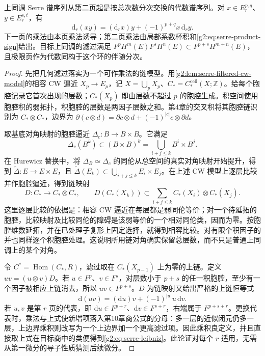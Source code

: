 \begin{theorem}\label{g2:thm:serre-multiplicative}
	上同调 Serre 谱序列从第二页起是按总次数分次交换的代数谱序列。对 \(x\in E_r^{p,q}\)、\(y\in E_r^{s,t}\)，有
	\begin{equation}\label{g2:eq:serre-leibniz}
		\mathrm d_r(xy)=(\mathrm d_rx)y+(-1)^{p+q}x\,\mathrm d_ry.
	\end{equation}
	下一页的乘法由本页乘法诱导；第二页乘法由局部系数杯积和\cref{g2:eq:serre-product-sign}给出。目标上同调的滤过满足 \(F^pH^m(E)F^sH^n(E)\subset F^{p+s}H^{m+n}(E)\)，且极限页作为代数同构于这个环的伴随分次。
\end{theorem}
\begin{proof}
	先把几何滤过落实为一个可作乘法的链模型。用\cref{g2:lem:serre-filtered-cw-model}的相容 CW 逼近 \(X_p\to E_p\)，记 \(X=\bigcup_pX_p\)、\(C_*=C_*^{\mathrm{cell}}(X;\mathbb Z)\)。给每个胞腔记录它首次出现的层数；\(C_*(X_p)\) 即由层数不超过 \(p\) 的胞腔生成。积空间使用胞腔积的弱拓扑，积胞腔的层数是两因子层数之和。第4章的交叉积将其胞腔链识别为 \(C_*\otimes C_*\)，边界为 \(\partial(c\otimes d)=\partial c\otimes d+(-1)^{|c|}c\otimes\partial d\)。

	取基底对角映射的胞腔逼近 \(\Delta_c:B\to B\times B\)。它满足
	\[
		\Delta_c(B^k)\subset(B\times B)^k=\bigcup_{i+j\le k}B^i\times B^j.
	\]
	在 Hurewicz 替换中，将 \(\Delta_B\simeq\Delta_c\) 的同伦从总空间的真实对角映射开始提升，得到 \(\widetilde\Delta:E\to E\times E\)，且 \(\widetilde\Delta(E_k)\subset\bigcup_{i+j\le k}E_i\times E_j\)。在上述 CW 模型上逐层比较并作胞腔逼近，得到链映射
	\[
		D:C_*\longrightarrow C_*\otimes C_*,\qquad
		D(C_*(X_k))\subset\sum_{i+j\le k}C_*(X_i)\otimes C_*(X_j).
	\]
	这里逐层比较的依据是：相容 CW 逼近在每层都是弱同伦等价；对一个待延拓的胞腔，比较映射及比较同伦的障碍是该弱等价的一个相对同伦类，因而为零。按胞腔维数延拓，并在已处理子复形上固定选择，就得到相容比较。对有限个积因子的并也同样逐个积胞腔处理。这说明所用链对角确实保留总层数，而不只是普通上同调上的某个对角。

	令 \(C^*=\operatorname{Hom}(C_*,R)\)，滤过取在 \(C_*(X_{p-1})\) 上为零的上链。定义 \(uv=(u\otimes v)D\)。若 \(u\in F^p\)、\(v\in F^s\)，对层数小于 \(p+s\) 的任一积胞腔，至少有一个因子被相应上链消去，所以 \(uv\in F^{p+s}\)。\(D\) 为链映射又给出严格的上链恒等式
	\[
		\mathrm d(uv)=(\mathrm du)v+(-1)^{|u|}u\,\mathrm dv.
	\]
	若 \(u,v\) 是第 \(r\) 页的代表，即 \(\mathrm du\in F^{p+r}\)、\(\mathrm dv\in F^{s+r}\)，右端属于 \(F^{p+s+r}\)。更换代表时，乘法与上式使新增项落入第10章商公式的分母：多一层的近似闭元仍多一层，上边界乘积则改写为一个上边界加一个更高滤过项。因此乘积良定义，并且直接取上式在目标商中的类便得到\cref{g2:eq:serre-leibniz}。此论证对每个 \(r\) 适用，无需从第一微分的导子性质猜测后续微分。


\end{proof}
